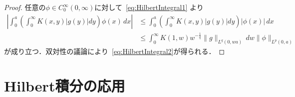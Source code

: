 \documentclass[paper=a4,
fontsize=12pt,
reqno,
uplatex,
dvipdfmx]{jlreq}
\theoremstyle{definition} %
\begin{document}
\begin{proof}
 任意の$\phi\in C_0^\infty(0,\infty)$に対して~\eqref{eq:HilbertIntegral1}
 より
 \begin{equation}
  \begin{split}
   \left|
   \int_0^a
   \left(
   \int_0^\infty
   K(x,y)
   |g(y)|
   dy
   \right)
   \phi(x)
   \,dx
   \right|
   &\leq
   \int_0^a
    \left(
     \int_0^\infty
     K(x,y)
     |g(y)|
     dy
    \right)
    |\phi(x)|
   \,dx
   \\
   &\leq
   \int_0^\infty
   K(1,w)
   w^{-\frac{1}{q}}
   \|g\|_{L^{q}(0,wa)}
   \,dw
   \|\phi\|_{L^p(0,a)}
  \end{split} 
 \end{equation}
 が成り立つ．双対性の議論により~\eqref{eq:HilbertIntegral2}が得られる．
\end{proof}

\section{Hilbert積分の応用}
\end{document}
